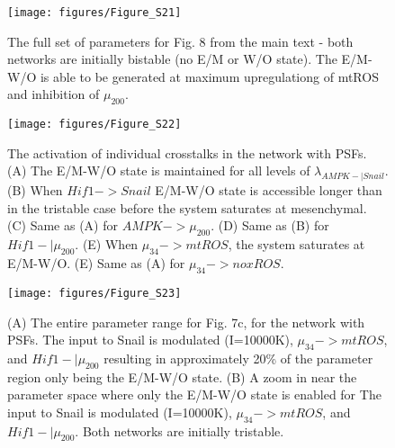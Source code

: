 \documentclass{article}
\begin{document}
\begin{figure}
\texttt{[image: figures/Figure\_S21]}
\caption{The full set of parameters for Fig. 8 from the main text - both networks are initially bistable (no E/M or W/O state). The E/M-W/O is able to be generated at maximum upregulationg of mtROS and inhibition of $\mu_{200}$. }
\end{figure}



\begin{figure}
\texttt{[image: figures/Figure\_S22]}
\caption{The activation of individual crosstalks in the network with PSFs. (A) The E/M-W/O state is maintained for all levels of $\lambda_{AMPK-|Snail}$. (B) When $Hif1-> Snail$ E/M-W/O state is accessible longer than in the tristable case before the system saturates at mesenchymal. (C) Same as (A) for $AMPK -> \mu_{200}$. (D) Same as (B) for $Hif1-| \mu_{200}$. (E) When $\mu_{34}->mtROS$, the system saturates at E/M-W/O. (E) Same as (A) for $\mu_{34}->noxROS$.}
\end{figure}

\begin{figure}
\texttt{[image: figures/Figure\_S23]}
\caption{(A) The entire parameter range for Fig. 7c, for the network with PSFs. The input to Snail is modulated (I=10000K), $\mu_{34}->mtROS$, and $Hif1-|\mu_{200}$ resulting in approximately 20\% of the parameter region only being the E/M-W/O state. (B) A zoom in near the parameter space where only the E/M-W/O state is enabled for The input to Snail is modulated (I=10000K), $\mu_{34}->mtROS$, and $Hif1-|\mu_{200}$. Both networks are initially tristable.}
\end{figure}


\FloatBarrier
\newpage

\end{document}
